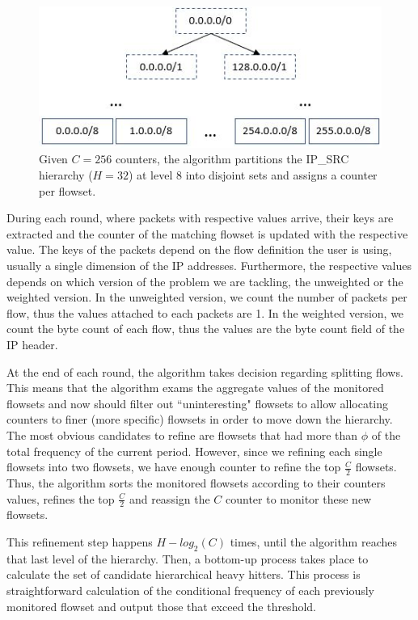 \begin{figure}
	\centering
    \includegraphics[width=\linewidth]{HHH/jpg_figures/init.JPG}
\caption[An example of partitioning the hierarchy given $256$ counters]{Given $C=256$ counters, the algorithm partitions the IP\_SRC hierarchy ($H=32$) at level $8$ into disjoint sets and assigns a counter per flowset.}
\label{fig:init}
\end{figure}

During each round, where packets with respective values arrive, their keys are extracted and the counter of the matching flowset is updated with the respective value. The keys of the packets depend on the flow definition the user is using, usually a single dimension of the IP addresses.
Furthermore, the respective values depends on which version of the problem we are tackling, the unweighted or the weighted version. In the unweighted version, we count the number of packets per flow, thus the values attached to each packets are 1. In the weighted version, we count the byte count of each flow, thus the values are the byte count field of the IP header.

At the end of each round, the algorithm takes decision regarding splitting flows. This means that the algorithm exams the aggregate values of the monitored flowsets and now should  filter out ``uninteresting" flowsets to allow allocating counters to finer (more specific) flowsets in order to move down the hierarchy. The most obvious candidates to refine are flowsets that had more than $\phi$ of the total frequency of the current period. However, since we refining each single flowsets into two flowsets, we have enough counter to refine the top $\frac{C}{2}$ flowsets. Thus, the algorithm sorts the monitored flowsets according to their counters values, refines the top $\frac{C}{2}$ and reassign the $C$ counter to monitor these new flowsets.

This refinement step happens $H-log_2(C)$ times, until the algorithm reaches that last level of the hierarchy. Then, a bottom-up process takes place to calculate the set of candidate hierarchical heavy hitters. This process is straightforward calculation of the conditional frequency of each previously monitored flowset and output those that exceed the threshold.


